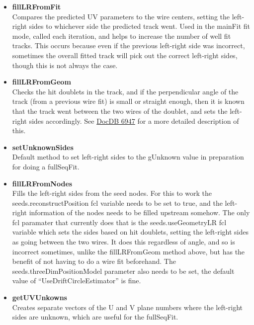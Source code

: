\begin{enumerate}
\begin{itemize}
          \item{\bf{fillLRFromFit}} \\ 
          Compares the predicted UV parameters to the wire centers, setting the left-right sides to whichever side the predicted track went. Used in the mainFit fit mode, called each iteration, and helps to increase the number of well fit tracks. This occurs because even if the previous left-right side was incorrect, sometimes the overall fitted track will pick out the correct left-right sides, though this is not always the case.

          \item{\bf{fillLRFromGeom}} \\
          Checks the hit doublets in the track, and if the perpendicular angle of the track (from a previous wire fit) is small or straight enough, then it is known that the track went between the two wires of the doublet, and sets the left-right sides accordingly. See \href{https://gm2-docdb.fnal.gov/cgi-bin/private/ShowDocument?docid=6947}{DocDB 6947} for a more detailed description of this.

          \item{\bf{setUnknownSides}} \\ 
          Default method to set left-right sides to the gUnknown value in preparation for doing a fullSeqFit.

          \item{\bf{fillLRFromNodes}} \\ 
          Fills the left-right sides from the seed nodes. For this to work the seeds.reconstructPosition fcl variable needs to be set to true, and the left-right information of the nodes needs to be filled upstream somehow. The only fcl paramater that currently does that is the seeds.useGeometryLR fcl variable which sets the sides based on hit doublets, setting the left-right sides as going between the two wires. It does this regardless of angle, and so is incorrect sometimes, unlike the fillLRFromGeom method above, but has the benefit of not having to do a wire fit beforehand. The seeds.threeDimPositionModel parameter also needs to be set, the default value of ``UseDriftCircleEstimator'' is fine.

          \item{\bf{getUVUnkowns}} \\
          Creates separate vectors of the U and V plane numbers where the left-right sides are unknown, which are useful for the fullSeqFit.


\end{itemize}
\end{enumerate}

